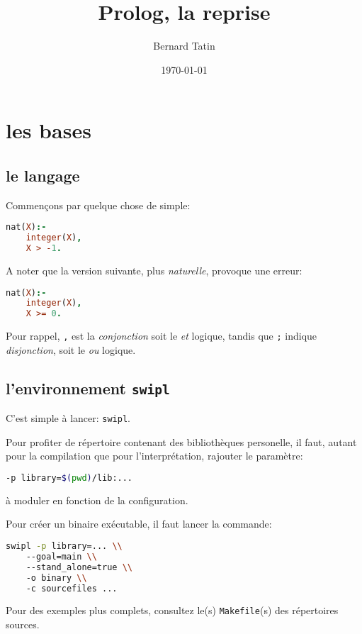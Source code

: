 \documentclass[a4paper,11pt,twocolumn]{book}
\title{Prolog, la reprise}
\author{Bernard Tatin}
\date{\today}
\begin{document}
\maketitle
\tableofcontents

\chapter{les bases}

\section{le langage}
Commençons par quelque chose de simple:

\begin{lstlisting}[language=Prolog]
nat(X):-
	integer(X),
	X > -1.
\end{lstlisting}

A noter que la version suivante, plus \emph{naturelle}, provoque une erreur:

\begin{lstlisting}[language=Prolog]
nat(X):-
	integer(X),
	X >= 0.
\end{lstlisting}

Pour rappel, \texttt{,} est la \textit{conjonction} soit le \textit{et} logique, tandis que \texttt{;} indique \textit{disjonction}, soit le \textit{ou} logique.

\section{l'environnement \texttt{swipl}}

C'est simple à lancer: \texttt{swipl}. 

Pour profiter de répertoire contenant des bibliothèques personelle, il faut, autant pour la compilation que pour l'interprétation, rajouter le paramètre:
\begin{lstlisting}[language=sh] 
-p library=$(pwd)/lib:...
\end{lstlisting}
 
à moduler en fonction de la configuration.

Pour créer un binaire exécutable, il faut lancer la commande:
\begin{lstlisting}[language=sh]
swipl -p library=... \\
    --goal=main \\
    --stand_alone=true \\
    -o binary \\
    -c sourcefiles ...
\end{lstlisting}

Pour des exemples plus complets, consultez le(s) \texttt{Makefile}(s) des répertoires sources. 
\end{document}
